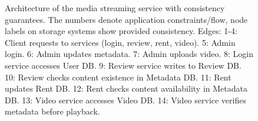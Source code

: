 \begin{figure}
\begin{minipage}[c]{0.5\textwidth}
	\end{minipage}
	\begin{minipage}[c]{0.48\textwidth}
		\centering
  \caption{Architecture of the media streaming service with
    consistency guarantees. The numbers denote application
    constraints/flow, node labels on storage systems show
    provided consistency. Edges:
    1-4: Client requests to services (login, review, rent, video).
    5: Admin login.
    6: Admin updates metadata.
    7: Admin uploads video.
    8: Login service accesses User DB.
    9: Review service writes to Review DB.
    10: Review checks content existence in Metadata DB.
    11: Rent updates Rent DB.
    12: Rent checks content availability in Metadata DB.
    13: Video service accesses Video DB.
    14: Video service verifies metadata before playback.
}
  \label{fig:case-study-media}
	\end{minipage}
\end{figure}



